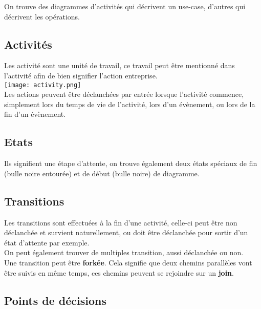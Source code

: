 \documentclass{report}
\begin{document}
		On trouve des diagrammes d'activités qui décrivent un use-case, d'autres qui décrivent les opérations.\\

		\subsection{Activités}

			Les activité sont une unité de travail, ce travail peut être mentionné dans l'activité afin de bien signifier l'action entreprise.\\

			\texttt{[image: activity.png]}\\

			Les actions peuvent être déclanchées par entrée lorsque l'activité commence, simplement lors du temps de vie de l'activité, lors d'un évènement, ou lors de la fin d'un évènement.\\

		\subsection{Etats}

			Ils signifient une étape d'attente, on trouve également deux états spéciaux de fin (bulle noire entourée) et de début (bulle noire) de diagramme.\\

		\subsection{Transitions}

			Les transitions sont effectuées à la fin d'une activité, celle-ci peut être non déclanchée et survient naturellement, ou doit être déclanchée pour sortir d'un état d'attente par exemple.\\

			On peut également trouver de multiples transition, aussi déclanchée ou non.\\

			Une transition peut être \textbf{forkée}. Cela signifie que deux chemins parallèles vont être suivis en même temps, ces chemins peuvent se rejoindre sur un \textbf{join}.\\

		\subsection{Points de décisions}
\end{document}
